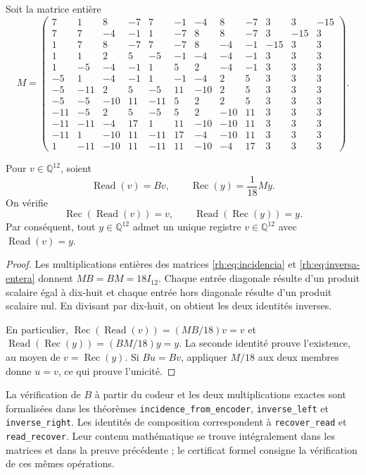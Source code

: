 Soit la matrice entière
\begingroup\small\setlength{\arraycolsep}{3pt}
\setcounter{MaxMatrixCols}{12}
\begin{equation}
M=\begin{pmatrix}
7&1&8&-7&7&-1&-4&8&-7&3&3&-15\\
7&7&-4&-1&1&-7&8&8&-7&3&-15&3\\
1&7&8&-7&7&-7&8&-4&-1&-15&3&3\\
1&1&2&5&-5&-1&-4&-4&-1&3&3&3\\
1&-5&-4&-1&1&5&2&-4&-1&3&3&3\\
-5&1&-4&-1&1&-1&-4&2&5&3&3&3\\
-5&-11&2&5&-5&11&-10&2&5&3&3&3\\
-5&-5&-10&11&-11&5&2&2&5&3&3&3\\
-11&-5&2&5&-5&5&2&-10&11&3&3&3\\
-11&-11&-4&17&1&11&-10&-10&11&3&3&3\\
-11&1&-10&11&-11&17&-4&-10&11&3&3&3\\
1&-11&-10&11&-11&11&-10&-4&17&3&3&3
\end{pmatrix}.
\label{rh:eq:inversa-entera}
\end{equation}
\endgroup

\begin{theorem}
\label{rh:thm:doce}
Pour $v\in\mathbb Q^{12}$, soient
\[
\operatorname{Read}(v)=Bv,
\qquad
\operatorname{Rec}(y)=\frac1{18}My.
\]
On vérifie
\[
\operatorname{Rec}(\operatorname{Read}(v))=v,
\qquad
\operatorname{Read}(\operatorname{Rec}(y))=y.
\]
Par conséquent, tout $y\in\mathbb Q^{12}$ admet un unique registre
$v\in\mathbb Q^{12}$ avec $\operatorname{Read}(v)=y$.
\end{theorem}
\begin{proof}
Les multiplications entières des matrices
\eqref{rh:eq:incidencia} et \eqref{rh:eq:inversa-entera} donnent
$MB=BM=18I_{12}$. Chaque entrée diagonale résulte d'un produit
scalaire égal à dix-huit et chaque entrée hors diagonale résulte
d'un produit scalaire nul. En divisant par dix-huit, on obtient
les deux identités inverses.

En particulier,
$\operatorname{Rec}(\operatorname{Read}(v))=(MB/18)v=v$ et
$\operatorname{Read}(\operatorname{Rec}(y))=(BM/18)y=y$.
La seconde identité prouve l'existence, au moyen de
$v=\operatorname{Rec}(y)$. Si $Bu=Bv$, appliquer $M/18$ aux deux
membres donne $u=v$, ce qui prouve l'unicité.
\end{proof}

La vérification de $B$ à partir du codeur et les deux multiplications
exactes sont formalisées dans les théorèmes
\texttt{incidence\_from\_encoder}, \texttt{inverse\_left} et
\texttt{inverse\_right}. Les identités de composition correspondent
à \texttt{recover\_read} et \texttt{read\_recover}.
Leur contenu mathématique se trouve intégralement dans les matrices et
dans la preuve précédente ; le certificat formel consigne la vérification
de ces mêmes opérations.

